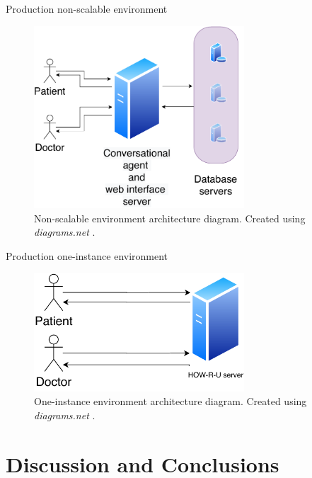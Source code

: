 \documentclass{beamer}
\begin{document}
\begin{frame}[fragile]{Production non-scalable environment}
  \begin{figure}[H]
    \centering
    \includegraphics[width=0.7\textwidth]{non-scalable.pdf}
    \caption{Non-scalable environment architecture diagram. Created using \emph{diagrams.net} \protect\cite{drawio}.}
  \end{figure}
\end{frame}

\begin{frame}[fragile]{Production one-instance environment}
  \begin{figure}[H]
    \centering
    \includegraphics[width=0.7\textwidth]{one-instance.pdf}
    \caption{One-instance environment architecture diagram. Created using \emph{diagrams.net} \protect\cite{drawio}.}
  \end{figure}
\end{frame}


\section{Discussion and Conclusions}
\end{document}

